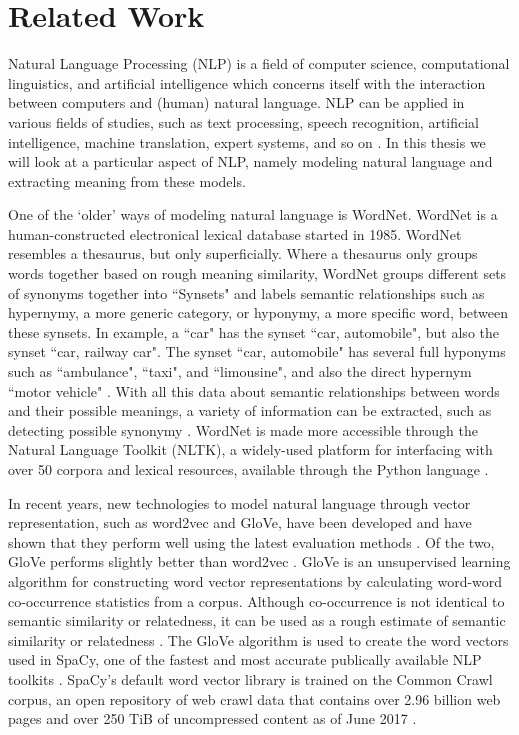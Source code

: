 \documentclass{article}
\begin{document}
\section{Related Work} \label{sec:relwork}

Natural Language Processing (NLP) is a field of computer science, computational linguistics, and artificial intelligence which concerns itself with the interaction between computers and (human) natural language. NLP can be applied in various fields of studies, such as text processing, speech recognition, artificial intelligence, machine translation, expert systems, and so on \citep{chowdhury2003natural}. In this thesis we will look at a particular aspect of NLP, namely modeling natural language and extracting meaning from these models.

One of the `older' ways of modeling natural language is WordNet. WordNet is a human-constructed electronical lexical database started in 1985. WordNet resembles a thesaurus, but only superficially. Where a thesaurus only groups words together based on rough meaning similarity, WordNet groups different sets of synonyms together into ``Synsets" and labels semantic relationships such as hypernymy, a more generic category, or hyponymy, a more specific word, between these synsets. In example, a ``car" has the synset ``car, automobile", but also the synset ``car, railway car". The synset ``car, automobile" has several full hyponyms such as ``ambulance", ``taxi", and ``limousine", and also the direct hypernym ``motor vehicle" \cite{princeton2010wordnet}. With all this data about semantic relationships between words and their possible meanings, a variety of information can be extracted, such as detecting possible synonymy \cite{kilgarriff2000wordnet}.
WordNet is made more accessible through the Natural Language Toolkit (NLTK), a widely-used platform for interfacing with over 50 corpora and lexical resources, available through the Python language \cite{bird2006nltk}.

In recent years, new technologies to model natural language through vector representation, such as word2vec and GloVe, have been developed \citep{mikolov2013efficient, pennington2014glove} and have shown that they perform well using the latest evaluation methods \citep{schnabel2015evaluation}. Of the two, GloVe performs slightly better than word2vec \citep{lee2016combining}.
GloVe is an unsupervised learning algorithm for constructing word vector representations by calculating word-word co-occurrence statistics from a corpus. Although co-occurrence is not identical to semantic similarity or relatedness, it can be used as a rough estimate of semantic similarity or relatedness \citep{levy2015improving}. The GloVe algorithm is used to create the word vectors used in SpaCy, one of the fastest and most accurate publically available NLP toolkits \citep{choi2015depends}. SpaCy's default word vector library is trained on the Common Crawl corpus, an open repository of web crawl data that contains over 2.96 billion web pages and over 250 TiB of uncompressed content as of June 2017 \citep{nagel2017commoncrawl}.
\end{document}

